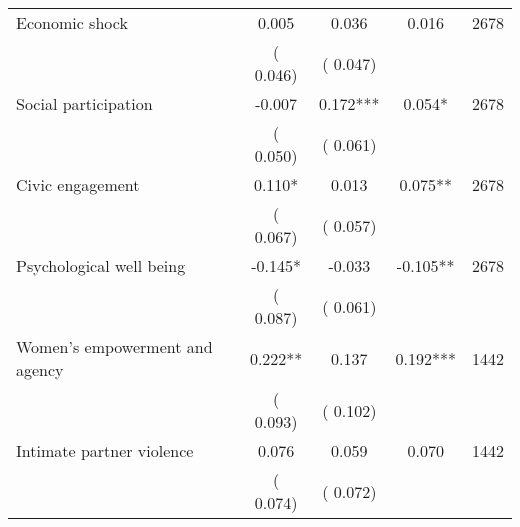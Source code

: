 \begin{tabular}{l*{4}{c}}
 Economic shock &              0.005 &         0.036 &           0.016 & 2678                       \\  
                 &        (       0.046)                   &        (       0.047)                        &                                                             &                                                      \\      

 Social participation &             -0.007 &         0.172*** &           0.054* & 2678                       \\  
                 &        (       0.050)                   &        (       0.061)                        &                                                             &                                                      \\      

 Civic engagement &              0.110* &         0.013 &           0.075** & 2678                       \\  
                 &        (       0.067)                   &        (       0.057)                        &                                                             &                                                      \\      

 Psychological well being &             -0.145* &        -0.033 &          -0.105** & 2678                       \\  
                 &        (       0.087)                   &        (       0.061)                        &                                                             &                                                      \\      

 Women's empowerment and agency &              0.222** &         0.137 &           0.192*** & 1442                       \\  
                 &        (       0.093)                   &        (       0.102)                        &                                                             &                                                      \\      

 Intimate partner violence &              0.076 &         0.059 &           0.070 & 1442                       \\  
                 &        (       0.074)                   &        (       0.072)                        &                                                             &                                                      \\      

\hline \end{tabular}                                                                                                              
